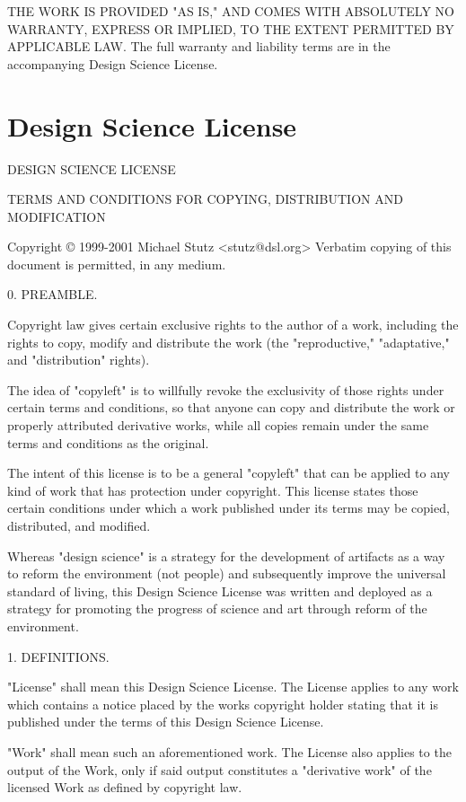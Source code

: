 \documentclass[
  english,
  11pt,
  a4paper,
]{article}
\begin{document}
THE WORK IS PROVIDED "AS IS," AND COMES WITH ABSOLUTELY NO WARRANTY,
EXPRESS OR IMPLIED, TO THE EXTENT PERMITTED BY APPLICABLE LAW. The full
warranty and liability terms are in the accompanying Design Science
License.

\section{Design Science License}\label{design-science-licence}

DESIGN SCIENCE LICENSE

TERMS AND CONDITIONS FOR COPYING, DISTRIBUTION AND MODIFICATION

Copyright © 1999-2001 Michael Stutz
\textless stutz@dsl.org\textgreater{} Verbatim copying of this document
is permitted, in any medium.

0. PREAMBLE.

Copyright law gives certain exclusive rights to the author of a work,
including the rights to copy, modify and distribute the work (the
"reproductive," "adaptative," and "distribution" rights).

The idea of "copyleft" is to willfully revoke the exclusivity of those
rights under certain terms and conditions, so that anyone can copy and
distribute the work or properly attributed derivative works, while all
copies remain under the same terms and conditions as the original.

The intent of this license is to be a general "copyleft" that can be
applied to any kind of work that has protection under copyright. This
license states those certain conditions under which a work published
under its terms may be copied, distributed, and modified.

Whereas "design science" is a strategy for the development of artifacts
as a way to reform the environment (not people) and subsequently improve
the universal standard of living, this Design Science License was
written and deployed as a strategy for promoting the progress of science
and art through reform of the environment.

1. DEFINITIONS.

"License" shall mean this Design Science License. The License applies to
any work which contains a notice placed by the work\textquotesingle s
copyright holder stating that it is published under the terms of this
Design Science License.

"Work" shall mean such an aforementioned work. The License also applies
to the output of the Work, only if said output constitutes a "derivative
work" of the licensed Work as defined by copyright law.
\end{document}
